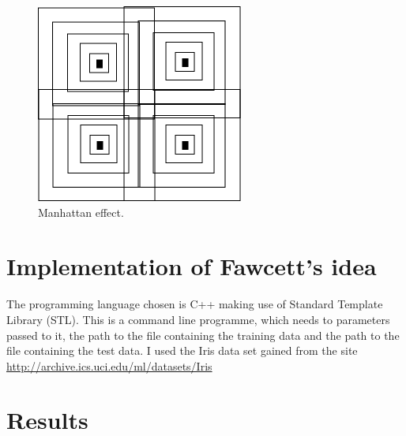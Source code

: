 \documentclass[11pt]{article}
\begin{document}
\begin{figure}[htb]
\centering
\includegraphics[width=30em \textwidth]{./manhattan_effect.png}
\caption{Manhattan effect.}
\end{figure}
\section{Implementation of Fawcett's \cite{fawcett08} idea}
\label{sec-4}

The programming language chosen is C++ making use of Standard Template
Library (STL).  This is a command line programme, which needs to
parameters passed to it, the path to the file containing the training
data and the path to the file containing the test data.  I used the
Iris data set gained from the site
\href{http://archive.ics.uci.edu/ml/datasets/Iris}{http://archive.ics.uci.edu/ml/datasets/Iris}
\section{Results}
\label{sec-5}
\end{document}
